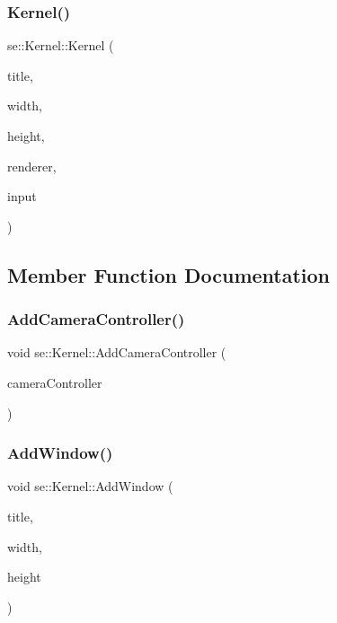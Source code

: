 \subsubsection{\texorpdfstring{Kernel()}{Kernel()}}
{\footnotesize\ttfamily se\+::\+Kernel\+::\+Kernel (\begin{DoxyParamCaption}\item[{const std\+::string \&}]{title,  }\item[{int}]{width,  }\item[{int}]{height,  }\item[{\mbox{\hyperlink{classse_1_1_abstract_renderer}{Abstract\+Renderer}} $\ast$}]{renderer,  }\item[{\mbox{\hyperlink{classse_1_1_input}{Input}} $\ast$}]{input }\end{DoxyParamCaption})}



\subsection{Member Function Documentation}
\mbox{\label{classse_1_1_kernel_ab35b0e949e62ab5addef0e21eb53a928}} 
\subsubsection{\texorpdfstring{Add\+Camera\+Controller()}{AddCameraController()}}
{\footnotesize\ttfamily void se\+::\+Kernel\+::\+Add\+Camera\+Controller (\begin{DoxyParamCaption}\item[{\mbox{\hyperlink{classse_1_1_camera_controller}{Camera\+Controller}} $\ast$}]{camera\+Controller }\end{DoxyParamCaption})}

\mbox{\label{classse_1_1_kernel_aafcef2223ca597327876f4f444d3521b}} 
\subsubsection{\texorpdfstring{Add\+Window()}{AddWindow()}}
{\footnotesize\ttfamily void se\+::\+Kernel\+::\+Add\+Window (\begin{DoxyParamCaption}\item[{const std\+::string \&}]{title,  }\item[{int}]{width,  }\item[{int}]{height }\end{DoxyParamCaption})}

